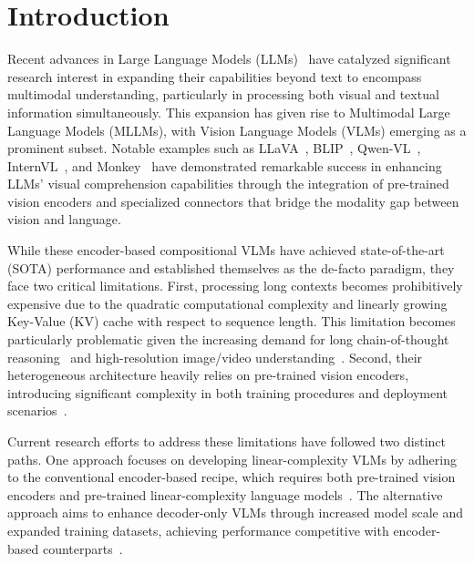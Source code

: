 \section{Introduction}
Recent advances in Large Language Models (LLMs)~\cite{gpt3, gpt4, llama, llama2, llama3, qwenllm, mistral, deepseek, phi2} have catalyzed significant research interest in expanding their capabilities beyond text to encompass multimodal understanding, particularly in processing both visual and textual information simultaneously. This expansion has given rise to Multimodal Large Language Models (MLLMs), with Vision Language Models (VLMs) emerging as a prominent subset. Notable examples such as LLaVA~\cite{llava}, BLIP~\cite{blip}, Qwen-VL~\cite{qwenvl}, InternVL~\cite{internvl}, and Monkey~\cite{monkey} have demonstrated remarkable success in enhancing LLMs' visual comprehension capabilities through the integration of pre-trained vision encoders and specialized connectors that bridge the modality gap between vision and language. 

While these encoder-based compositional VLMs have achieved state-of-the-art (SOTA) performance and established themselves as the de-facto paradigm, they face two critical limitations. 
First, processing long contexts becomes prohibitively expensive due to the quadratic computational complexity and linearly growing Key-Value (KV) cache with respect to sequence length. 
This limitation becomes particularly problematic given the increasing demand for long chain-of-thought reasoning~\cite{s1,deepseekr1,k1p5,llavacot} and high-resolution image/video understanding~\cite{videollm,hrvlm,vim,vig,dig}. Second, their heterogeneous architecture heavily relies on pre-trained vision encoders, introducing significant complexity in both training procedures and deployment scenarios~\cite{solo}.

Current research efforts to address these limitations have followed two distinct paths. One approach focuses on developing linear-complexity VLMs by adhering to the conventional encoder-based recipe, which requires both pre-trained vision encoders and pre-trained linear-complexity language models~\cite{visualrwkv,vlmamba}. The alternative approach aims to enhance decoder-only VLMs through increased model scale and expanded training datasets, achieving performance competitive with encoder-based counterparts~\cite{fuyu,eve,hovle,chameleon,emu3}. 



